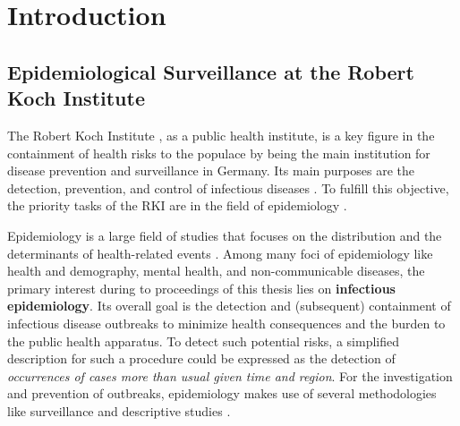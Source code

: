 \chapter{Introduction}

\section{Epidemiological Surveillance at the Robert Koch Institute}
The Robert Koch Institute , as a public health institute, is a key figure in the containment of health risks to the populace by being the main institution for disease prevention and surveillance in Germany.
Its main purposes are the detection, prevention, and control of infectious diseases \citep{rki_definition}.
To fulfill this objective, the priority tasks of the RKI are in the field of epidemiology \citep{rki_definition}.

Epidemiology is a large field of studies that focuses on the distribution and the determinants of health-related events \citep{WHOepi}.
Among many foci of epidemiology like health and demography, mental health, and non-communicable diseases, the primary interest during to proceedings of this thesis lies on \textbf{infectious epidemiology}.
Its overall goal is the detection and (subsequent) containment of infectious disease outbreaks to minimize health consequences and the burden to the public health apparatus.
To detect such potential risks, a simplified description for such a procedure could be expressed as the detection of \textit{occurrences of cases more than usual given time and region}.
For the investigation and prevention of outbreaks, epidemiology makes use of several methodologies like surveillance and descriptive studies \citep{WHOepi}.


